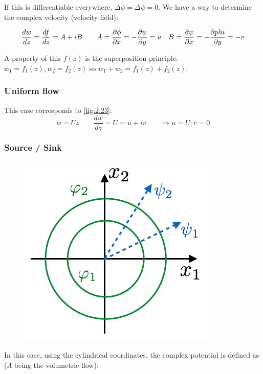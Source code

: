 		If this is differentiable everywhere, $\Delta \phi = \Delta \psi = 0$. We have a way to determine the complex velocity (velocity field):
 		
 		\begin{equation}
 		\frac{dw}{dz} = \frac{df}{dz} = A + iB \qquad A = \frac{\partial \phi}{\partial x} = - \frac{\partial \psi}{\partial y} = u \quad B = \frac{\partial \psi}{\partial x} = - \frac{\partial phi}{\partial y} = -v
 		\end{equation}
 		
 		A property of this $f(z)$ is the superposition principle: $w_1 = f_1(z), w_2 = f_2(z)$ so $w_1 + w_2 = f_1(z)+f_2(z)$.
 		
 	\subsubsection{Uniform flow}
 		This case corresponds to \autoref{fig:2.23}:
 		\begin{equation}
 		w = U z \qquad \frac{d w}{dz} = U = u+iv \qquad \Rightarrow u = U; v = 0
 		\end{equation}
 		
 	\subsubsection{Source / Sink}
 		\begin{figure}
		\vspace{-5mm}
		\includegraphics[scale=0.3]{ch2/25}
		\end{figure}
		In this case, using the cylindrical coordinates, the complex potential is defined as ($\Lambda$ being the volumetric flow): 
 		
